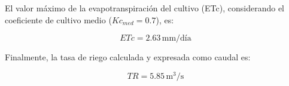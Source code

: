 \documentclass{article}  %
\begin{document}
El valor máximo de la evapotranspiración del cultivo (ETc), considerando el coeficiente de cultivo medio ($Kc_{med} = 0.7$), es:

\begin{equation}
ETc = 2.63 \, \text{mm/día}
\end{equation}

Finalmente, la tasa de riego calculada y expresada como caudal es:

\begin{equation}
TR = 5.85 \, \text{m}^3/\text{s}
\end{equation}

  
\end{document}
